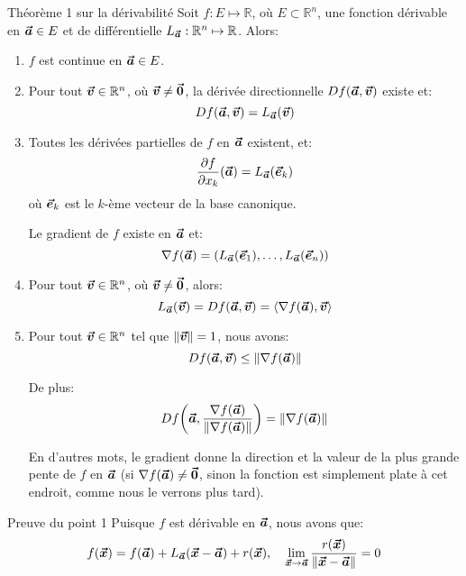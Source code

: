 \documentclass[a4paper]{article}
\begin{document}
\begin{parag}{Théorème 1 sur la dérivabilité}
    Soit $f: E \mapsto \mathbb{R}$, où $E \subset \mathbb{R}^n$, une fonction dérivable en $\bm{\protect\vec{a}} \in E$ et de différentielle $L_{\bm{\protect\vec{a}}} : \mathbb{R}^n \mapsto \mathbb{R}$. Alors:
    \begin{enumerate}
        \item $f$ est continue en $\bm{\protect\vec{a}} \in E$.
        \item Pour tout $\bm{\protect\vec{v}} \in \mathbb{R}^n$, où $\bm{\protect\vec{v}} \neq \bm{\protect\vec{0}}$, la dérivée directionnelle $Df\left(\bvec{a}, \bvec{v}\right)$ existe et: 
            \[Df\left(\bvec{a}, \bvec{v}\right)= L_{\bvec{a}}\left(\bvec{v}\right)\]
        \item Toutes les dérivées partielles de $f$ en $\bm{\protect\vec{a}}$ existent, et: 
        \[\frac{\partial f}{\partial x_{k}}\left(\bvec{a}\right) = L_{\bvec{a}}\left(\bvec{e}_k\right)\]
        où $\bm{\protect\vec{e}}_k$ est le $k$-ème vecteur de la base canonique.
    
        Le gradient de $f$ existe en $\bm{\protect\vec{a}}$ et: 
        \[\nabla f\left(\bvec{a}\right) = \left(L_{\bvec{a}}\left(\bvec{e}_1\right), \ldots, L_{\bvec{a}}\left(\bvec{e}_n\right)\right)\]
        
        \item Pour tout $\bm{\protect\vec{v}} \in \mathbb{R}^n$, où $\bm{\protect\vec{v}} \neq \bm{\protect\vec{0}}$, alors: 
        \[L_{\bvec{a}}\left(\bvec{v}\right) = Df\left(\bvec{a}, \bvec{v}\right) = \left<\nabla f\left(\bvec{a}\right), \bvec{v}\right>\]
        \item Pour tout $\bm{\protect\vec{v}} \in \mathbb{R}^n$ tel que $\left\|\bvec{v}\right\| = 1$, nous avons: 
            \[Df\left(\bvec{a}, \bvec{v}\right) \leq \left\|\nabla f\left(\bvec{a}\right)\right\|\]
        
            De plus: 
            \[Df\left(\bvec{a}, \frac{\nabla f\left(\bvec{a}\right)}{\left\|\nabla f\left(\bvec{a}\right)\right\|}\right) = \left\|\nabla f\left(\bvec{a}\right)\right\|\]
            
            En d'autres mots, le gradient donne la direction et la valeur de la plus grande pente de $f$ en $\bm{\protect\vec{a}}$ (si $\nabla f\left(\bvec{a}\right) \neq \bvec{0}$, sinon la fonction est simplement plate à cet endroit, comme nous le verrons plus tard).
    \end{enumerate}
    
    \begin{subparag}{Preuve du point 1}
        Puisque $f$ est dérivable en $\bm{\protect\vec{a}}$, nous avons que: 
        \[f\left(\bvec{x}\right) = f\left(\bvec{a}\right) + L_{\bvec{a}}\left(\bvec{x} - \bvec{a}\right) + r\left(\bvec{x}\right), \mathspace \lim_{\bvec{x} \to \bvec{a}} \frac{r\left(\bvec{x}\right)}{\left\|\bvec{x} - \bvec{a}\right\|} = 0\]
        

\end{subparag}
\end{parag}
\end{document}
